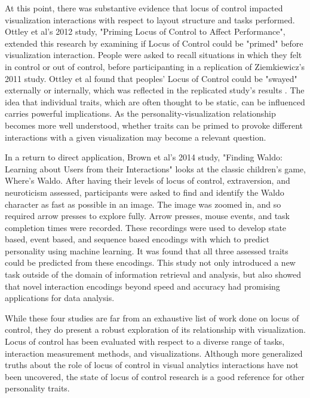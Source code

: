 \documentclass[conference]{IEEEtran}
\begin{document}
 At this point, there was substantive evidence that locus of control impacted
 visualization interactions with respect to layout structure
and tasks performed. Ottley et al's 2012 study, "Priming Locus of Control
to Affect Performance", extended this research by examining if Locus of Control
could be "primed" before visualization interaction. People were asked
to recall situations in which they felt in control or out of control, before
participanting in a replication of Ziemkiewicz's 2011 study. Ottley et al found
that peoples' Locus of Control could be "swayed" externally or internally, which
was reflected in the replicated study's results \cite{OttleyPriming}. The idea
that individual traits, which are often thought to be static, can be influenced
carries powerful implications. As the personality-visualization relationship
becomes more well understood, whether traits can be primed to provoke different
interactions with a given visualization may become a relevant question.

In a return to direct application, Brown et al's 2014 study, "Finding Waldo:
Learning about Users from their Interactions" looks at the classic children's
game, Where's Waldo. After having their levels of locus of control,
extraversion, and neuroticism assessed, participants were asked to find and
identify the Waldo character as fast as possible in an image. The image was
zoomed in, and so required arrow presses to explore fully. Arrow presses,
mouse events, and task completion times were recorded. These recordings
were used to develop state based, event based, and sequence based encodings
with which to predict personality using machine learning. It was found that
all three assessed traits could be predicted from these encodings\cite{Waldo}.
This study not only introduced a new task outside of the domain of information
retrieval and analysis, but also showed that novel interaction encodings beyond
speed and accuracy had promising applications for data analysis.

While these four studies are far from an exhaustive list of work done on
locus of control, they do present a robust exploration of its relationship with
visualization. Locus of control has been evaluated with respect to a diverse
range of tasks, interaction measurement methods, and visualizations. Although
more generalized truths about the role of locus of control in visual analytics
interactions have not been uncovered, the state of locus of control research
is a good reference for other personality traits.
\end{document}
